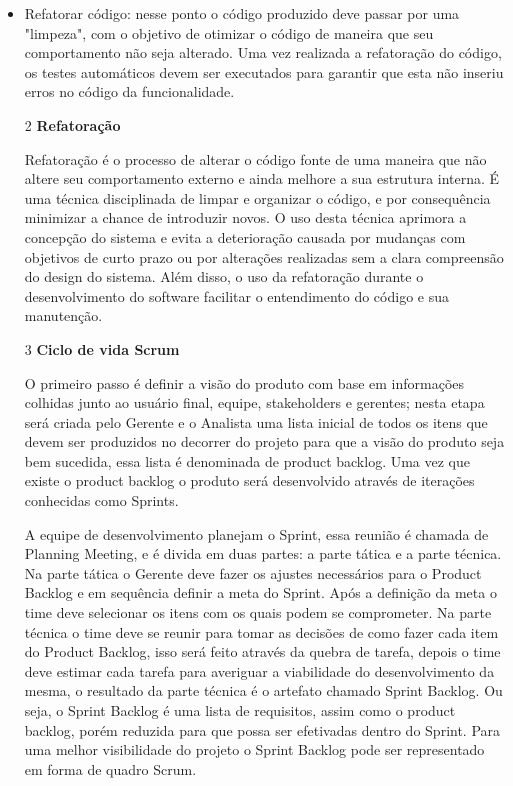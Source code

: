 \documentclass[	DIV=calc,%
							paper=a4,%
							fontsize=12pt,%
							onecolumn]{scrartcl}	 					%
\begin{document}
\begin{itemize}
    \item Refatorar código: nesse ponto o código produzido deve passar por uma "limpeza", com o objetivo de otimizar o código de maneira que seu comportamento não seja alterado. Uma vez realizada a refatoração do código, os testes automáticos devem ser executados para garantir que esta não inseriu erros no código da funcionalidade.

\item[2] {\textbf{Refatoração}}

Refatoração é o processo de alterar o código fonte de uma maneira que não altere seu comportamento externo e ainda melhore a sua estrutura interna. É uma técnica disciplinada de limpar e organizar o código, e por consequência minimizar a chance de introduzir novos. O uso desta técnica aprimora a concepção do sistema e evita a deterioração causada por mudanças com objetivos de curto prazo ou por alterações realizadas sem a clara compreensão do design do sistema. Além disso, o uso da refatoração durante o desenvolvimento do software facilitar o entendimento do código e sua manutenção.

\item[3] {\textbf{Ciclo de vida Scrum}}

O primeiro passo é definir a visão do produto com base em informações colhidas junto ao usuário final, equipe, stakeholders e gerentes; nesta etapa será criada pelo Gerente e o Analista uma lista inicial de todos os itens que devem ser produzidos no decorrer do projeto para que a visão do produto seja bem sucedida, essa lista é denominada de product backlog. Uma vez que existe o product backlog o produto será desenvolvido através de iterações conhecidas como Sprints. 

   A equipe de desenvolvimento planejam o Sprint, essa reunião é chamada de Planning Meeting, e é divida em duas partes: a parte tática e a parte técnica. Na parte tática o Gerente deve fazer os ajustes necessários para o Product Backlog e em sequência definir a meta do Sprint. Após a definição da meta o time deve selecionar os itens com os quais podem se comprometer. Na parte técnica o time deve se reunir para tomar as decisões de como fazer cada item do Product Backlog, isso será feito através da quebra de tarefa, depois o time deve estimar cada tarefa para averiguar a viabilidade do desenvolvimento da mesma, o resultado da parte técnica é o artefato chamado Sprint Backlog. Ou seja, o Sprint Backlog é uma lista de requisitos, assim como o product backlog, porém reduzida para que possa ser efetivadas dentro do Sprint. Para uma melhor visibilidade do projeto o Sprint Backlog pode ser representado em forma de quadro Scrum.


\end{itemize}
\end{document}
